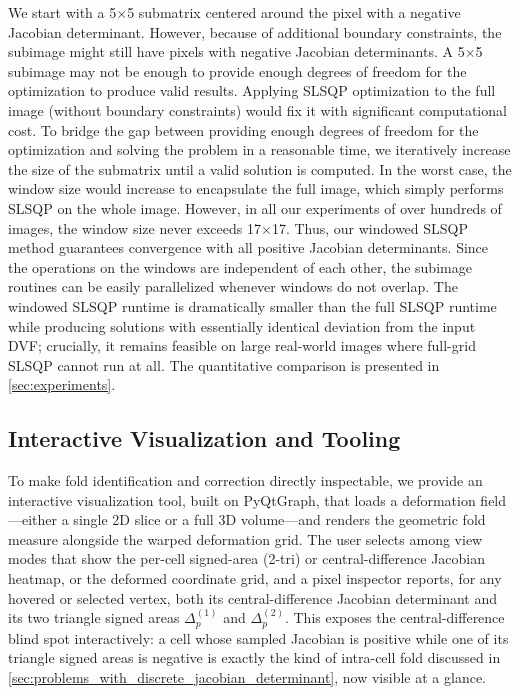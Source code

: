 \documentclass[lettersize,journal]{IEEEtran}
\begin{document}
We start with a 5$\times$5 submatrix centered around the pixel with a negative Jacobian determinant. However, because of additional boundary constraints, the subimage might still have pixels with negative Jacobian determinants. A 5$\times$5 subimage may not be enough to provide enough degrees of freedom for the optimization to produce valid results. Applying SLSQP optimization to the full image (without boundary constraints) would fix it with significant computational cost. To bridge the gap between providing enough degrees of freedom for the optimization and solving the problem in a reasonable time, we iteratively increase the size of the submatrix until a valid solution is computed. In the worst case, the window size would increase to encapsulate the full image, which simply performs SLSQP on the whole image. However, in all our experiments of over hundreds of images, the window size never exceeds 17$\times$17. Thus, our windowed SLSQP method guarantees convergence with all positive Jacobian determinants. Since the operations on the windows are independent of each other, the subimage routines can be easily parallelized whenever windows do not overlap. The windowed SLSQP runtime is dramatically smaller than the full SLSQP runtime while producing solutions with essentially identical deviation from the input DVF; crucially, it remains feasible on large real-world images where full-grid SLSQP cannot run at all. The quantitative comparison is presented in \autoref{sec:experiments}.

\subsection{Interactive Visualization and Tooling}
\label{sec:gui}

To make fold identification and correction directly inspectable, we provide an interactive visualization tool, built on PyQtGraph, that loads a deformation field---either a single 2D slice or a full 3D volume---and renders the geometric fold measure alongside the warped deformation grid. The user selects among view modes that show the per-cell signed-area (2-tri) or central-difference Jacobian heatmap, or the deformed coordinate grid, and a pixel inspector reports, for any hovered or selected vertex, both its central-difference Jacobian determinant and its two triangle signed areas $\Delta^{(1)}_p$ and $\Delta^{(2)}_p$. This exposes the central-difference blind spot interactively: a cell whose sampled Jacobian is positive while one of its triangle signed areas is negative is exactly the kind of intra-cell fold discussed in \autoref{sec:problems_with_discrete_jacobian_determinant}, now visible at a glance.
\end{document}
